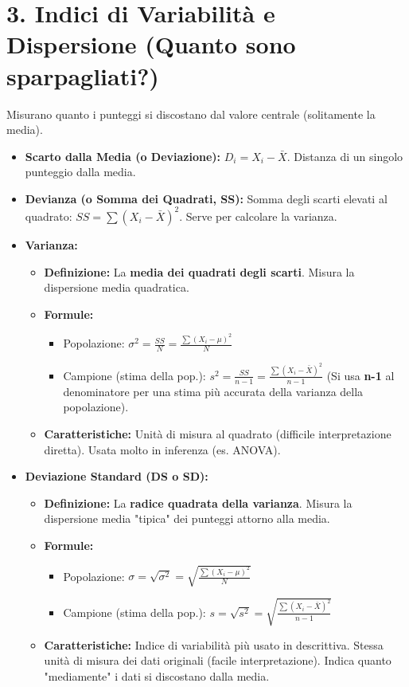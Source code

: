 \documentclass[12pt, a4paper]{article}
\newcommand{\popmean}{\mu} %
\newcommand{\samplemean}{\bar{X}} %
\newcommand{\popvar}{\sigma^2} %
\newcommand{\samplevar}{s^2} %
\newcommand{\popsd}{\sigma} %
\newcommand{\samplesd}{s} %
\begin{document}
\section*{3. Indici di Variabilità e Dispersione (Quanto sono sparpagliati?)}
Misurano quanto i punteggi si discostano dal valore centrale (solitamente la media).
\begin{itemize}
    \item \textbf{Scarto dalla Media (o Deviazione):} $D_i = X_i - \samplemean$. Distanza di un singolo punteggio dalla media.
    \item \textbf{Devianza (o Somma dei Quadrati, SS):} Somma degli scarti elevati al quadrato: $SS = \sum (X_i - \samplemean)^2$. Serve per calcolare la varianza.
    \item \textbf{Varianza:}
        \begin{itemize}
            \item \textbf{Definizione:} La \textbf{media dei quadrati degli scarti}. Misura la dispersione media quadratica.
            \item \textbf{Formule:}
                \begin{itemize}
                    \item Popolazione: $\popvar = \frac{SS}{N} = \frac{\sum (X_i - \popmean)^2}{N}$
                    \item Campione (stima della pop.): $\samplevar = \frac{SS}{n-1} = \frac{\sum (X_i - \samplemean)^2}{n-1}$ (Si usa \textbf{n-1} al denominatore per una stima più accurata della varianza della popolazione).
                \end{itemize}
            \item \textbf{Caratteristiche:} Unità di misura al quadrato (difficile interpretazione diretta). Usata molto in inferenza (es. ANOVA).
        \end{itemize}
    \item \textbf{Deviazione Standard (DS o SD):}
        \begin{itemize}
            \item \textbf{Definizione:} La \textbf{radice quadrata della varianza}. Misura la dispersione media "tipica" dei punteggi attorno alla media.
            \item \textbf{Formule:}
                \begin{itemize}
                    \item Popolazione: $\popsd = \sqrt{\popvar} = \sqrt{\frac{\sum (X_i - \popmean)^2}{N}}$
                    \item Campione (stima della pop.): $\samplesd = \sqrt{\samplevar} = \sqrt{\frac{\sum (X_i - \samplemean)^2}{n-1}}$
                \end{itemize}
            \item \textbf{Caratteristiche:} Indice di variabilità più usato in descrittiva. Stessa unità di misura dei dati originali (facile interpretazione). Indica quanto "mediamente" i dati si discostano dalla media.
        \end{itemize}
\end{itemize}
\end{document}
